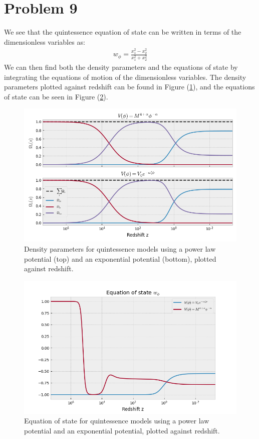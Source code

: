 \documentclass[reprint,english,notitlepage]{revtex4-1}  %
\begin{document}
\section{Problem 9}
We see that the quintessence equation of state can be written in terms of the
dimensionless variables as:
\begin{align}
		w_\phi = \frac{x_1^2 - x_2^2}{x_1^2 + x_2^2}
\end{align}
We can then find both the density parameters and the equations of state by
integrating the equations of motion of the dimensionless variables. The
density parameters plotted against redshift can be found in Figure
(\ref{fig:omegas}), and the equations of state can be seen in Figure (\ref{fig:eos}).

\begin{figure}[h!]
	\includegraphics[scale=0.4]{density_parameters.png}
	\caption{Density parameters for quintessence models using a power law potential
	(top) and an exponential potential (bottom), plotted against redshift. }
	\label{fig:omegas}
\end{figure}


\begin{figure}[h!]
	\includegraphics[scale=0.45]{eos.png}
	\caption{Equation of state for quintessence models using a power law potential
	and an exponential potential, plotted against redshift.}
	\label{fig:eos}
\end{figure}
\end{document}

